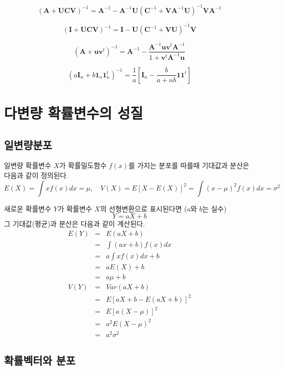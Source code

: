 \documentclass[
]{book}
\theoremstyle{definition}
\theoremstyle{definition}
\theoremstyle{definition}
\theoremstyle{definition}
\theoremstyle{remark}
\begin{document}
\[ (\bm A+\bm U\bm C\bm V)^{-1} = \bm A^{-1}-\bm A^{-1} \bm U (\bm C^{-1} + \bm V \bm A^{-1}\bm U)^{-1} \bm V \bm A^{-1} \]

\[ (\bm I+\bm U\bm C\bm V)^{-1} = \bm I - \bm U (\bm C^{-1} + \bm V \bm U)^{-1} \bm V \]

\[ (\bm A+\bm u\bm v^t)^{-1} = \bm A^{-1} - \frac{ \bm A^{-1} \bm u\bm v^t \bm A^{-1}}{1+\bm v^t \bm A^{-1}\bm u} \]

\[ (a \bm I_n + b \bm 1_n \bm 1_n^t)^{-1} = \frac{1}{a} \left [ \bm I_n - \frac{b}{a+nb} \bm 1 \bm 1^t \right ] \]

\hypertarget{mulivar}{%
\chapter{다변량 확률변수의 성질}\label{mulivar}}

\hypertarget{uxc77cuxbcc0uxb7c9uxbd84uxd3ec}{%
\section{일변량분포}\label{uxc77cuxbcc0uxb7c9uxbd84uxd3ec}}

일변량 확률변수 \(X\)가 확률밀도함수 \(f(x)\)를 가지는 분포를 따를때 기대값과 분산은 다음과 같이 정의된다.
\[ E(X) = \int x f(x)  dx = \mu, \quad V(X) = E[ X-E(X)]^2=\int (x-\mu)^2 f(x) dx =\sigma^2 \]

새로운 확률변수 \(Y\)가 확률변수 \(X\)의 선형변환으로 표시된다면 (\(a\)와 \(b\)는 실수)
\[ Y = aX+b\]
그 기대값(평균)과 분산은 다음과 같이 계산된다.
\begin{eqnarray*}
E(Y) &=& E(aX+b) \\
&=& \int (ax+b) f(x) dx \\
&=& a \int x f(x) dx + b \\
&=& a E(X) + b\\
&=& a \mu + b \\
V(Y) &=& Var(aX+b) \\
&=& E[aX+b -E(aX+b)]^2 \\
&=& E[a(X-\mu)]^2 \\
&=& a^2 E(X-\mu)^2\\
&=& a^2 \sigma^2
\end{eqnarray*}

\hypertarget{uxd655uxb960uxbca1uxd130uxc640-uxbd84uxd3ec}{%
\section{확률벡터와 분포}\label{uxd655uxb960uxbca1uxd130uxc640-uxbd84uxd3ec}}
\end{document}

